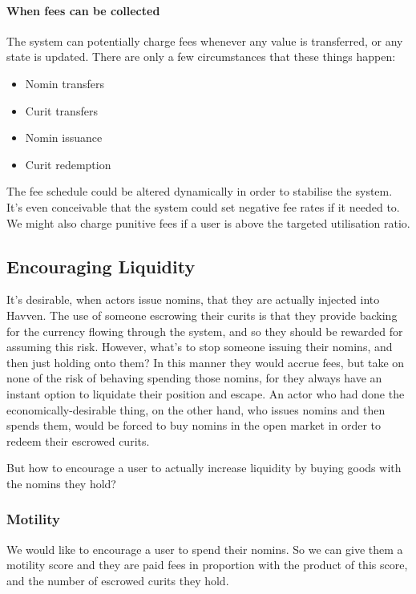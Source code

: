 \documentclass{article}
\begin{document}
\paragraph{When fees can be collected}
The system can potentially charge fees whenever any value is transferred, or any state is updated.
There are only a few circumstances that these things happen:
\begin{itemize}
    \item Nomin transfers
    \item Curit transfers
    \item Nomin issuance
    \item Curit redemption
\end{itemize}
The fee schedule could be altered dynamically in order to stabilise the system. It's even conceivable
that the system could set negative fee rates if it needed to.
We might also charge punitive fees if a user is above the targeted utilisation ratio.


\pagebreak
\subsection{Encouraging Liquidity}

It's desirable, when actors issue nomins, that they are actually injected into Havven.
The use of someone escrowing their curits is that they provide backing for the currency flowing through the system,
and so they should be rewarded for assuming this risk.
However, what's to stop someone issuing their nomins, and then just holding onto them? In this manner they
would accrue fees, but take on none of the risk of behaving spending those nomins, for they always have an instant
option to liquidate their position and escape. An actor who had done the economically-desirable thing, on
the other hand, who issues nomins and then spends them, would be forced to buy nomins in the open market in
order to redeem their escrowed curits.

But how to encourage a user to actually increase liquidity by buying goods with the nomins they hold? 


\subsubsection{Motility}

We would like to encourage a user to spend their nomins. So we can give them a motility score 
and they are paid fees in proportion with the product of this score, and the number of escrowed curits
they hold.
\end{document}
